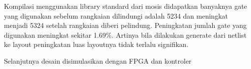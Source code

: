Kompilasi menggunakan library standard dari mosis didapatkan banyaknya gate yang digunakan sebelum rangkaian dilindungi adalah 5234 dan meningkat menjadi 5324 setelah rangkaian diberi pelindung. Peningkatan jumlah gate yang digunakan meningkat sekitar 1.69\%. Artinya bila dilakukan generate dari netlist ke layout peningkatan luas layoutnya tidak terlalu signifikan.

Selanjutnya desain disimulasikan dengan FPGA dan kontroler